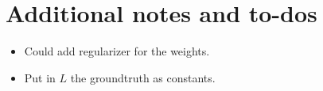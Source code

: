 \documentclass[english,11pt,a4paper]{article}
\begin{document}
\section{Additional notes and to-dos}

\begin{itemize}
	\item Could add regularizer for the weights.
	\item Put in $L$ the groundtruth as constants.
\end{itemize}

{\small
  
  
}
\end{document}

